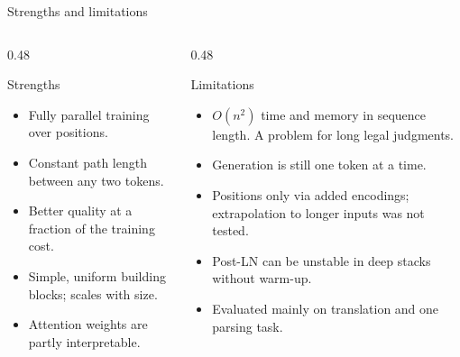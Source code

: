 \documentclass[aspectratio=169,11pt]{beamer}
\begin{document}
\begin{frame}{Strengths and limitations}
  \begin{columns}[T]
    \begin{column}{0.48\textwidth}
      \begin{exampleblock}{Strengths}
        \small
        \begin{itemize}
          \item Fully parallel training over positions.
          \item Constant path length between any two tokens.
          \item Better quality at a fraction of the training cost.
          \item Simple, uniform building blocks; scales with size.
          \item Attention weights are partly interpretable.
        \end{itemize}
      \end{exampleblock}
    \end{column}
    \begin{column}{0.48\textwidth}
      \begin{alertblock}{Limitations}
        \small
        \begin{itemize}
          \item $O(n^2)$ time and memory in sequence length. A problem for long legal judgments.
          \item Generation is still one token at a time.
          \item Positions only via added encodings; extrapolation to longer inputs was not tested.
          \item Post-LN can be unstable in deep stacks without warm-up.
          \item Evaluated mainly on translation and one parsing task.
        \end{itemize}
      \end{alertblock}
    \end{column}
  \end{columns}
\end{frame}
\end{document}

